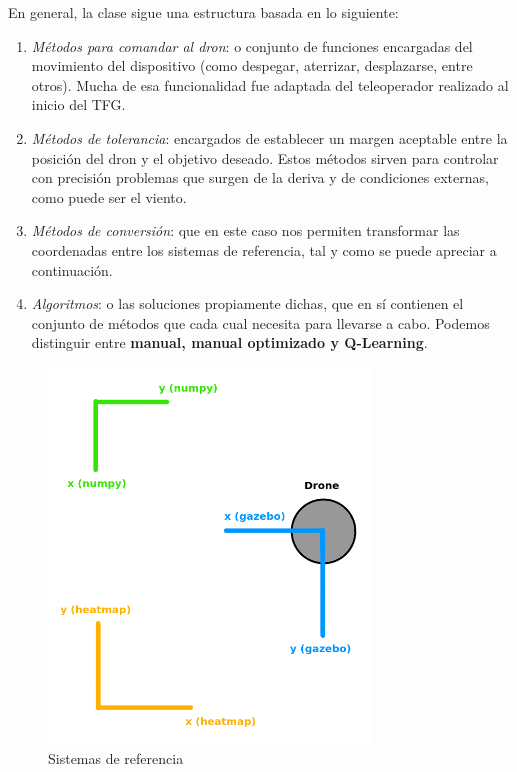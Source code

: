 En general, la clase sigue una estructura basada en lo siguiente:

\begin{enumerate}
	\item \emph{Métodos para comandar al dron}: o conjunto de funciones encargadas del movimiento del dispositivo (como despegar, aterrizar, desplazarse, entre otros). Mucha de esa funcionalidad fue adaptada del teleoperador realizado al inicio del \ac{TFG}.

    \item \emph{Métodos de tolerancia}: encargados de establecer un margen aceptable entre la posición del dron y el objetivo deseado. Estos métodos sirven para controlar con precisión problemas que surgen de la deriva y de condiciones externas, como puede ser el viento.

	\item \emph{Métodos de conversión}: que en este caso nos permiten transformar las coordenadas entre los sistemas de referencia, tal y como se puede apreciar a continuación.

    \item \emph{Algoritmos}: o las soluciones propiamente dichas, que en sí contienen el conjunto de métodos que cada cual necesita para llevarse a cabo. Podemos distinguir entre \textbf{manual, manual optimizado y Q-Learning}.
\end{enumerate}

\begin{figure} [H]
    \begin{center}
    \includegraphics[height=10cm]{imagenes/cap4/8_reference_system.png}
    \end{center}
    \caption[Sistemas de referencia]{Sistemas de referencia}
    \label{fig:reference_sys}
\end{figure}

